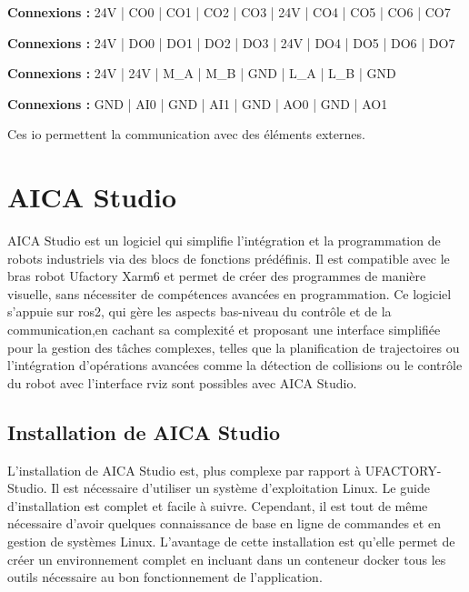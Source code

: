 \begin{tcolorbox}[colframe=black, colback=ConfigOutputColor, title=Configurable Outputs]
    \textbf{Connexions :} 24V | CO0 | CO1 | CO2 | CO3 | 24V | CO4 | CO5 | CO6 | CO7
\end{tcolorbox}

\begin{tcolorbox}[colframe=black, colback=DigitalOutputColor, title=Digital Outputs]
    \textbf{Connexions :} 24V | DO0 | DO1 | DO2 | DO3 | 24V | DO4 | DO5 | DO6 | DO7
\end{tcolorbox}

\begin{tcolorbox}[colframe=black, colback=RS485Color, title=RS485]
    \textbf{Connexions :} 24V | 24V | M\_A | M\_B | GND | L\_A | L\_B | GND
\end{tcolorbox}

\begin{tcolorbox}[colframe=black, colback=AnalogColor, title=Analog]
    \textbf{Connexions :} GND | AI0 | GND | AI1 | GND | AO0 | GND | AO1
\end{tcolorbox}

Ces \gls{io} permettent la communication avec des éléments externes.

\section{AICA Studio}
AICA Studio est un logiciel qui simplifie l'intégration et la programmation de robots industriels via des blocs de fonctions prédéfinis. Il est compatible avec le bras robot Ufactory Xarm6 et permet de créer des programmes de manière visuelle, sans nécessiter de compétences avancées en programmation. Ce logiciel s'appuie sur \gls{ros2}, qui gère les aspects bas-niveau du contrôle et de la communication,en cachant sa complexité et proposant une interface simplifiée pour la gestion des tâches complexes, telles que la planification de trajectoires ou l'intégration d'opérations avancées comme la détection de collisions ou le contrôle du robot avec l'interface \gls{rviz} sont possibles avec AICA Studio.

\subsection{Installation de AICA Studio}
L'installation de AICA Studio est, plus complexe par rapport à UFACTORY-Studio. Il est nécessaire d'utiliser un système d'exploitation Linux. Le guide d'installation \cite{AICADocs} est complet et facile à suivre. Cependant, il est tout de même nécessaire d'avoir quelques connaissance de base en ligne de commandes et en gestion de systèmes Linux. L'avantage de cette installation est qu'elle permet de créer un environnement complet en incluant dans un \gls{conteneur} \gls{docker} tous les outils nécessaire au bon fonctionnement de l'application.

